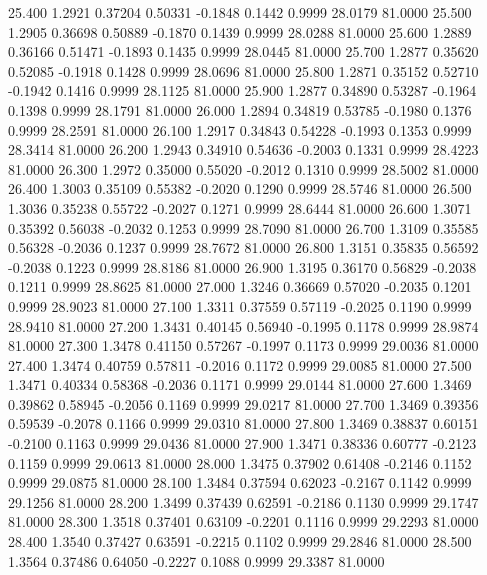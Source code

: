   25.400   1.2921   0.37204   0.50331  -0.1848   0.1442   0.9999  28.0179  81.0000
  25.500   1.2905   0.36698   0.50889  -0.1870   0.1439   0.9999  28.0288  81.0000
  25.600   1.2889   0.36166   0.51471  -0.1893   0.1435   0.9999  28.0445  81.0000
  25.700   1.2877   0.35620   0.52085  -0.1918   0.1428   0.9999  28.0696  81.0000
  25.800   1.2871   0.35152   0.52710  -0.1942   0.1416   0.9999  28.1125  81.0000
  25.900   1.2877   0.34890   0.53287  -0.1964   0.1398   0.9999  28.1791  81.0000
  26.000   1.2894   0.34819   0.53785  -0.1980   0.1376   0.9999  28.2591  81.0000
  26.100   1.2917   0.34843   0.54228  -0.1993   0.1353   0.9999  28.3414  81.0000
  26.200   1.2943   0.34910   0.54636  -0.2003   0.1331   0.9999  28.4223  81.0000
  26.300   1.2972   0.35000   0.55020  -0.2012   0.1310   0.9999  28.5002  81.0000
  26.400   1.3003   0.35109   0.55382  -0.2020   0.1290   0.9999  28.5746  81.0000
  26.500   1.3036   0.35238   0.55722  -0.2027   0.1271   0.9999  28.6444  81.0000
  26.600   1.3071   0.35392   0.56038  -0.2032   0.1253   0.9999  28.7090  81.0000
  26.700   1.3109   0.35585   0.56328  -0.2036   0.1237   0.9999  28.7672  81.0000
  26.800   1.3151   0.35835   0.56592  -0.2038   0.1223   0.9999  28.8186  81.0000
  26.900   1.3195   0.36170   0.56829  -0.2038   0.1211   0.9999  28.8625  81.0000
  27.000   1.3246   0.36669   0.57020  -0.2035   0.1201   0.9999  28.9023  81.0000
  27.100   1.3311   0.37559   0.57119  -0.2025   0.1190   0.9999  28.9410  81.0000
  27.200   1.3431   0.40145   0.56940  -0.1995   0.1178   0.9999  28.9874  81.0000
  27.300   1.3478   0.41150   0.57267  -0.1997   0.1173   0.9999  29.0036  81.0000
  27.400   1.3474   0.40759   0.57811  -0.2016   0.1172   0.9999  29.0085  81.0000
  27.500   1.3471   0.40334   0.58368  -0.2036   0.1171   0.9999  29.0144  81.0000
  27.600   1.3469   0.39862   0.58945  -0.2056   0.1169   0.9999  29.0217  81.0000
  27.700   1.3469   0.39356   0.59539  -0.2078   0.1166   0.9999  29.0310  81.0000
  27.800   1.3469   0.38837   0.60151  -0.2100   0.1163   0.9999  29.0436  81.0000
  27.900   1.3471   0.38336   0.60777  -0.2123   0.1159   0.9999  29.0613  81.0000
  28.000   1.3475   0.37902   0.61408  -0.2146   0.1152   0.9999  29.0875  81.0000
  28.100   1.3484   0.37594   0.62023  -0.2167   0.1142   0.9999  29.1256  81.0000
  28.200   1.3499   0.37439   0.62591  -0.2186   0.1130   0.9999  29.1747  81.0000
  28.300   1.3518   0.37401   0.63109  -0.2201   0.1116   0.9999  29.2293  81.0000
  28.400   1.3540   0.37427   0.63591  -0.2215   0.1102   0.9999  29.2846  81.0000
  28.500   1.3564   0.37486   0.64050  -0.2227   0.1088   0.9999  29.3387  81.0000
